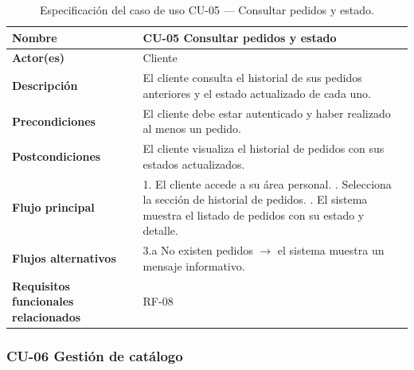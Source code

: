\begin{table}[H]
\centering
\small
\begin{tabular}{|m{}|m{}|}
\hline
\textbf{Nombre} & CU-05 Consultar pedidos y estado \\ \hline
\textbf{Actor(es)} & Cliente \\ \hline
\textbf{Descripción} & El cliente consulta el historial de sus pedidos anteriores y el estado actualizado de cada uno. \\ \hline
\textbf{Precondiciones} & El cliente debe estar autenticado y haber realizado al menos un pedido. \\ \hline
\textbf{Postcondiciones} & El cliente visualiza el historial de pedidos con sus estados actualizados. \\ \hline
\textbf{Flujo principal} & 1. El cliente accede a su área personal. \newline 2. Selecciona la sección de historial de pedidos. \newline 3. El sistema muestra el listado de pedidos con su estado y detalle. \\ \hline
\textbf{Flujos alternativos} & 3.a No existen pedidos $\rightarrow$ el sistema muestra un mensaje informativo. \\ \hline
\textbf{Requisitos funcionales relacionados} & RF-08 \\ \hline
\end{tabular}
\caption{Especificación del caso de uso CU-05 — Consultar pedidos y estado.}
\end{table}

\clearpage

\subsubsection{CU-06 Gestión de catálogo}

